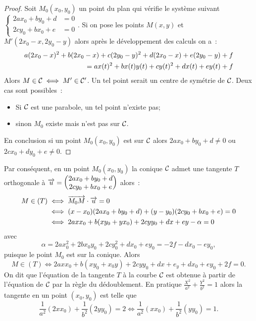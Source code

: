 \begin{proof}
  Soit $M_0(x_0,y_0)$ un point du plan qui vérifie le système suivant $\begin{cases}2ax_0+by_0+d &=0 \\ 2cy_0+bx_0+e &=0\end{cases}$. Si on pose les points $M(x,y)$ et $M'(2x_0-x,2y_0-y)$ alors après le développement des calculs on a~:
  \begin{align}
    a(2x_0-x)^2+b(2x_0-x)+c(2y_0-y)^2+d(2x_0-x)+e(2y_0-y)+f \notag \\
= ax(t)^2+bx(t)y(t)+cy(t)^2+dx(t)+ey(t)+f
  \end{align}
Alors $M \in \mathcal{C}_{{}} \iff M' \in \mathcal{C}_{{}}'$. Un tel point serait un centre de symétrie de $\mathcal{C}_{{}}$. Deux cas sont possibles~:
\begin{itemize}
\item Si $\mathcal{C}_{{}}$ est une parabole, un tel point n'existe pas;
\item sinon $M_0$ existe mais n'est pas sur $\mathcal{C}_{{}}$.
\end{itemize}
En conclusion si un point $M_0(x_0,y_0)$ est sur $\mathcal{C}_{{}}$ alors $2ax_0+by_0+d \neq 0$ ou $2cx_0+dy_0+e \neq 0$.
\end{proof}
Par conséquent, en un point $M_0(x_0,y_0)$ la conique $\mathcal{C}_{{}}$ admet une tangente $T$ orthogonale à $\overrightarrow{u}=\begin{pmatrix} 2ax_0 +by_0 +d \\ 2cy_0+bx_0+e \end{pmatrix}$  alors~:
\begin{align}
M \in (T) &\iff \overrightarrow{M_0 M} \cdot \overrightarrow{u}=0 \\
&\iff (x-x_0)(2ax_0+by_0+d)+(y-y_0)(2cy_0+bx_0+e)=0 \\
&\iff 2axx_0 + b(xy_0+yx_0)+2cyy_0 +dx+ey - \alpha=0
\end{align}
avec 
\begin{equation}
\alpha=2ax_0^2+  2bx_0y_0+2cy_0^2+dx_0+ey_0=-2f-dx_0-ey_0,
\end{equation}
puisque le point $M_0$ est sur la conique. Alors
\begin{equation}
  M \in (T) \iff 2axx_0+b(xy_0+x_0y)+2cyy_0+dx+e_y+dx_0+ey_0+2f=0.
\end{equation}
On dit que l'équation de la tangente $T$ à la courbe $\mathcal{C}_{{}}$ est obtenue à partir de l'équation de $\mathcal{C}_{{}}$ par la règle du dédoublement. En pratique $\frac{X^2}{a^2} + \frac{Y^2}{b^2}=1$ alors la tangente en un point $(x_0,y_0)$ est telle que
\begin{equation}
  \frac{1}{a^2}(2xx_0) + \frac{1}{b^2}(2yy_0)=2 \iff \frac{1}{a^2}(xx_0) + \frac{1}{b^2}(yy_0)=1.
\end{equation}

